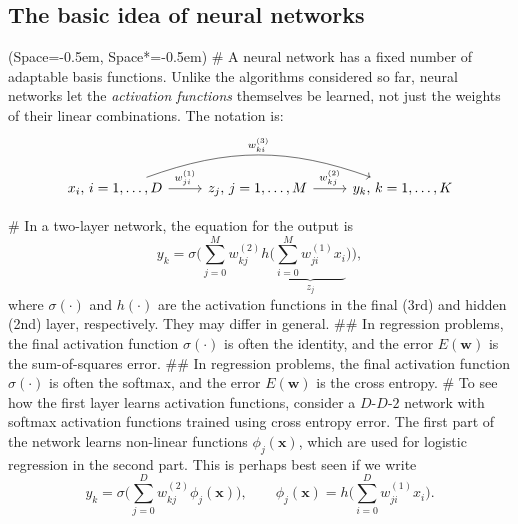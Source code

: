 \documentclass[12pt, a4paper]{article}
\newcommand{\listSpace}{-0.5em}%
\newcommand{\vect}[1]{\bm{#1}}
\begin{document}
\subsection*{The basic idea of neural networks}
\begin{easylist}[itemize]
	\ListProperties(Space=\listSpace, Space*=\listSpace)
	# A neural network has a fixed number of adaptable basis functions.
	Unlike the algorithms considered so far, neural networks let the \emph{activation functions} themselves be learned, not just the weights of their linear combinations. The notation is:
	\begin{equation*}
	\begin{tikzcd}
	x_i, \, i=1,\ldots, D \arrow{r}{w_{ji}^{\text{(1)}}}
	\arrow[bend left = 20]{rr}{w_{ki}^{\text{(3)}}}
	&  
	z_j , \, j=1,\ldots, M \arrow{r}{w_{kj}^{\text{(2)}}} & 
	y_k , \, k=1,\ldots, K
	\end{tikzcd}
	\end{equation*}
	
	# In a two-layer network, the equation for the output is
	\begin{equation*}
		y_k = \sigma \bigg( 
		\sum_{j=0}^{M} w_{kj}^{(2)}
		h 
		\bigg( 
		\underbrace{\sum_{i=0}^{M} w_{ji}^{(1)} x_i}_{z_j}
		 \bigg)
		 \bigg),
	\end{equation*}
	where $\sigma(\cdot)$ and $h(\cdot)$ are the activation functions in the final (3rd) and hidden (2nd) layer, respectively.
	They may differ in general.
	## In regression problems, the final activation function $\sigma(\cdot)$ is often the identity, and the error $E(\vect{w})$ is the sum-of-squares error.
	## In regression problems, the final activation function $\sigma(\cdot)$ is often the softmax, and the error $E(\vect{w})$ is the cross entropy.
	# To see how the first layer learns activation functions, consider a $D$-$D$-$2$ network with softmax activation functions trained using cross entropy error.
	The first part of the network learns non-linear functions $\phi_j(\vect{x})$, which are used for logistic regression in the second part.
	This is perhaps best seen if we write
	\begin{equation*}
		y_k = \sigma \bigg( 
		\sum_{j=0}^{D} w_{kj}^{(2)}
		\phi_j(\vect{x})
		\bigg),
		\quad 
		 \quad
		\phi_j(\vect{x})
		=
		h 
		\bigg( 
		\sum_{i=0}^{D} w_{ji}^{(1)} x_i
		\bigg).
	\end{equation*}
	
	
\end{easylist}
\end{document}
